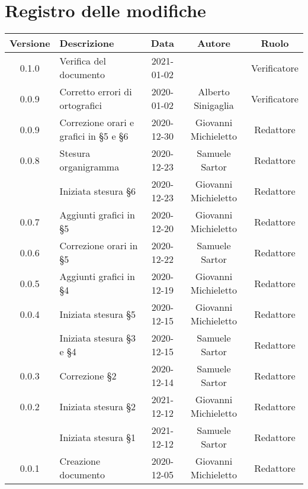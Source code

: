 \section*{Registro delle modifiche}

\begin{center}
	\begin{longtable}{|c|p{5cm}|c|c|c|}
	\hline
	\rowcolor{lighter-grayer}
	\textbf{Versione} & \textbf{Descrizione} & \textbf{Data} & \textbf{Autore} & \textbf{Ruolo} \\
	\hline
	\endfirsthead


	0.1.0 & Verifica del documento & 2021-01-02 & & Verificatore \\
	\hline 
	0.0.9 & Corretto errori di ortografici & 2020-01-02	& Alberto Sinigaglia & Verificatore \\
	\hline 
	0.0.9 & Correzione orari e grafici in §5 e §6 & 2020-12-30	& Giovanni Michieletto & Redattore \\
	\hline 
	0.0.8 & Stesura organigramma & 2020-12-23 & Samuele Sartor & Redattore \\
	\hline 
		  & Iniziata stesura §6 & 2020-12-23 & Giovanni Michieletto & Redattore \\
		  \hline 
	0.0.7 & Aggiunti grafici in §5 & 2020-12-20	& Giovanni Michieletto & Redattore \\
	\hline 
	0.0.6 & Correzione orari in §5 & 2020-12-22 & Samuele Sartor & Redattore \\
	\hline 
	0.0.5 & Aggiunti grafici in §4 & 2020-12-19	&Giovanni Michieletto & Redattore \\
	\hline 
	0.0.4 & Iniziata stesura §5 & 2020-12-15 & Giovanni Michieletto & Redattore \\
	\hline 
		  & Iniziata stesura §3 e §4 & 2020-12-15 & Samuele Sartor & Redattore \\
		  \hline 
	0.0.3 & Correzione §2 & 2020-12-14 & Samuele Sartor & Redattore \\
	\hline 
	0.0.2 & Iniziata stesura §2 & 2021-12-12 & Giovanni Michieletto & Redattore \\
	\hline 
		  & Iniziata stesura §1  & 2021-12-12 & Samuele Sartor & Redattore \\
		  \hline 
	0.0.1 & Creazione documento & 2020-12-05 & Giovanni Michieletto & Redattore \\
	\hline

	\end{longtable}
\end{center}